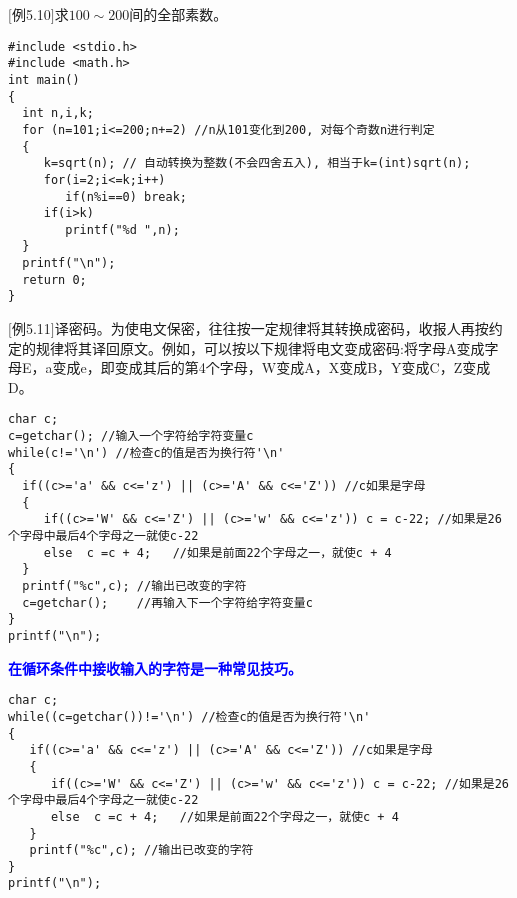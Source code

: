 \begin{frame}
\small
$[$例5.10$]$求$100\sim 200$间的全部素数。
\pause
\begin{lstlisting}
#include <stdio.h>
#include <math.h>
int main()
{
  int n,i,k;
  for (n=101;i<=200;n+=2) //n从101变化到200, 对每个奇数n进行判定
  {
     k=sqrt(n); // 自动转换为整数(不会四舍五入), 相当于k=(int)sqrt(n);
     for(i=2;i<=k;i++)
        if(n%i==0) break;
     if(i>k) 
        printf("%d ",n);
  }
  printf("\n");
  return 0;
}
\end{lstlisting}
\end{frame}

\begin{frame}
\small
$[$例5.11$]$译密码。为使电文保密，往往按一定规律将其转换成密码，收报人再按约定的规律将其译回原文。例如，可以按以下规律将电文变成密码:将字母A变成字母E，a变成e，即变成其后的第4个字母，W变成A，X变成B，Y变成C，Z变成D。
\pause
\begin{lstlisting}
char c;
c=getchar(); //输入一个字符给字符变量c
while(c!='\n') //检查c的值是否为换行符'\n'  
{
  if((c>='a' && c<='z') || (c>='A' && c<='Z')) //c如果是字母
  {
     if((c>='W' && c<='Z') || (c>='w' && c<='z')) c = c-22; //如果是26个字母中最后4个字母之一就使c-22
     else  c =c + 4;   //如果是前面22个字母之一，就使c + 4
  }
  printf("%c",c); //输出已改变的字符
  c=getchar();    //再输入下一个字符给字符变量c
}
printf("\n");
\end{lstlisting}
\end{frame}

\begin{frame}
\textbf{\textcolor{blue}{在循环条件中接收输入的字符是一种常见技巧。}}
\begin{lstlisting}
char c;
while((c=getchar())!='\n') //检查c的值是否为换行符'\n'  
{
   if((c>='a' && c<='z') || (c>='A' && c<='Z')) //c如果是字母
   {
      if((c>='W' && c<='Z') || (c>='w' && c<='z')) c = c-22; //如果是26个字母中最后4个字母之一就使c-22
      else  c =c + 4;   //如果是前面22个字母之一，就使c + 4
   }
   printf("%c",c); //输出已改变的字符
}
printf("\n");
\end{lstlisting}
\end{frame}
